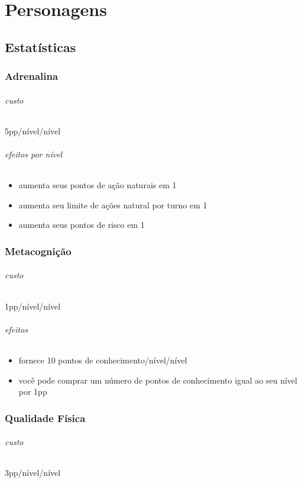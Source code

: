 \part{Personagens}
\chapter{Estatísticas}
\section{Adrenalina}
\paragraph{custo} 5pp/nível/nível
\paragraph{efeitos por nível}
\begin{itemize}
  \item aumenta seus pontos de ação naturais em 1
  \item aumenta seu limite de ações natural por turno em 1
  \item aumenta seus pontos de risco em 1
\end{itemize}
%
%
\section{Metacognição}
\paragraph{custo} 1pp/nível/nível
\paragraph{efeitos}
\begin{itemize}
  \item fornece 10 pontos de conhecimento/nível/nível
  \item você pode comprar um número de pontos de conhecimento igual ao seu nível por 1pp
\end{itemize}
%
%
\section{Qualidade Física}
\paragraph{custo} 3pp/nível/nível
